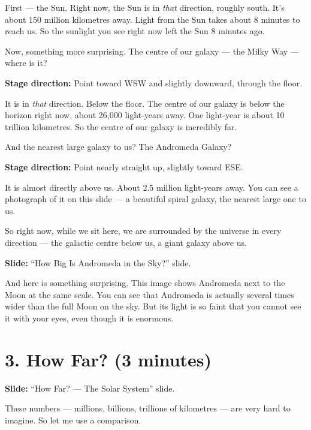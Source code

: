\documentclass[10pt,a4paper]{article}
\newenvironment{stagenote}
  {\begin{mdframed}[linecolor=blue!50, backgroundcolor=blue!5, linewidth=1pt]%
   \small\color{blue!70!black}\textbf{Stage direction:} }
  {\end{mdframed}}
\newenvironment{slidenote}
  {\begin{mdframed}[linecolor=green!50!black, backgroundcolor=green!5, linewidth=1pt]%
   \small\color{green!40!black}\textbf{Slide:} }
  {\end{mdframed}}
\begin{document}
First --- the Sun. Right now, the Sun is in \emph{that} direction, roughly south. It's about 150 million kilometres away. Light from the Sun takes about 8 minutes to reach us. So the sunlight you see right now left the Sun 8 minutes ago.

Now, something more surprising. The centre of our galaxy --- the Milky Way --- where is it?

\begin{stagenote}
Point toward WSW and slightly downward, through the floor.
\end{stagenote}

It is in \emph{that} direction. Below the floor. The centre of our galaxy is below the horizon right now, about 26,000 light-years away. One light-year is about 10 trillion kilometres. So the centre of our galaxy is incredibly far.

And the nearest large galaxy to us? The Andromeda Galaxy?

\begin{stagenote}
Point nearly straight up, slightly toward ESE.
\end{stagenote}

It is almost directly above us. About 2.5 million light-years away. You can see a photograph of it on this slide --- a beautiful spiral galaxy, the nearest large one to us.

So right now, while we sit here, we are surrounded by the universe in every direction --- the galactic centre below us, a giant galaxy above us.

\begin{slidenote}
``How Big Is Andromeda in the Sky?'' slide.
\end{slidenote}

And here is something surprising. This image shows Andromeda next to the Moon at the same scale. You can see that Andromeda is actually several times wider than the full Moon on the sky. But its light is so faint that you cannot see it with your eyes, even though it is enormous.

\section*{3. How Far? (3 minutes)}

\begin{slidenote}
``How Far? --- The Solar System'' slide.
\end{slidenote}

These numbers --- millions, billions, trillions of kilometres --- are very hard to imagine. So let me use a comparison.
\end{document}
